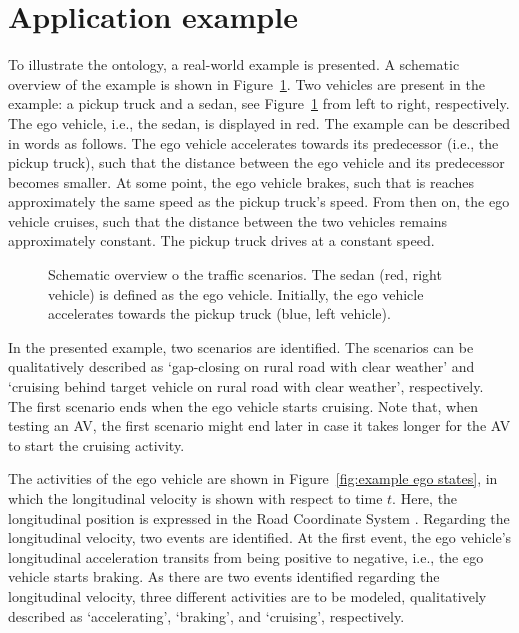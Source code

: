 \section{Application example}
\label{sec:example}

To illustrate the ontology, a real-world example is presented. A schematic overview of the example is shown in Figure~\ref{fig:example schematic}. Two vehicles are present in the example: a pickup truck and a sedan, see Figure~\ref{fig:example schematic} from left to right, respectively. The ego vehicle, i.e., the sedan, is displayed in red. The example can be described in words as follows. The ego vehicle accelerates towards its predecessor (i.e., the pickup truck), such that the distance between the ego vehicle and its predecessor becomes smaller. At some point, the ego vehicle brakes, such that is reaches approximately the same speed as the pickup truck's speed. From then on, the ego vehicle cruises, such that the distance between the two vehicles remains approximately constant. The pickup truck drives at a constant speed.

\begin{figure}
	\centering
	\setlength\figureheight{121pt}
	\setlength\figurewidth{260pt}
	
	\caption{Schematic overview o the traffic scenarios. The sedan (red, right vehicle) is defined as the ego vehicle. Initially, the ego vehicle accelerates towards the pickup truck (blue, left vehicle).}
	\label{fig:example schematic}
\end{figure}

In the presented example, two scenarios are identified. The scenarios can be qualitatively described as `gap-closing on rural road with clear weather' and `cruising behind target vehicle on rural road with clear weather', respectively. The first scenario ends when the ego vehicle starts cruising. Note that, when testing an AV, the first scenario might end later in case it takes longer for the AV to start the cruising activity.

The activities of the ego vehicle are shown in Figure~\ref{fig:example ego states}, in which the longitudinal velocity is shown with respect to time $t$. Here, the longitudinal position is expressed in the Road Coordinate System \cite{zofka2015datadrivetrafficscenarios}. Regarding the longitudinal velocity, two events are identified. At the first event, the ego vehicle's longitudinal acceleration transits from being positive to negative, i.e., the ego vehicle starts braking. As there are two events identified regarding the longitudinal velocity, three different activities are to be modeled, qualitatively described as `accelerating', `braking', and `cruising', respectively. 

